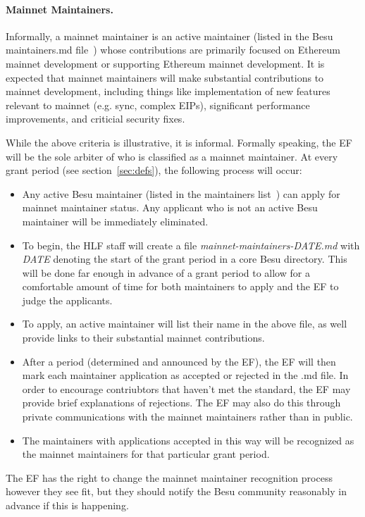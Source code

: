 \paragraph{Mainnet Maintainers.} Informally, a mainnet maintainer is an active maintainer (listed in the Besu maintainers.md file~\cite{BesuM}) whose contributions are primarily focused on Ethereum mainnet development or supporting Ethereum mainnet development.  It is expected that mainnet maintainers will make substantial contributions to mainnet development, including things like implementation of new features relevant to mainnet (e.g. sync, complex EIPs), significant performance improvements, and criticial security fixes.

While the above criteria is illustrative, it is informal.  Formally speaking, the EF will be the sole arbiter of who is classified as a mainnet maintainer.  At every grant period (see section~\ref{sec:defs}), the following process will occur:
\begin{itemize}
\item Any active Besu maintainer (listed in the maintainers list~\cite{BesuM}) can apply for mainnet maintainer status.  Any applicant who is not an active Besu maintainer will be immediately eliminated.
\item To begin, the HLF staff will create a file \emph{mainnet-maintainers-DATE.md} with \emph{DATE} denoting the start of the grant period in a core Besu directory.  This will be done far enough in advance of a grant period to allow for a comfortable amount of time for both maintainers to apply and the EF to judge the applicants.
\item To apply, an active maintainer will list their name in the above file, as well provide links to their substantial mainnet contributions.
\item After a period (determined and announced by the EF), the EF will then mark each maintainer application as accepted or rejected in the .md file.  In order to encourage contriubtors that haven't met the standard, the EF may provide brief explanations of rejections.  The EF may also do this through private communications with the mainnet maintainers rather than in public.
\item The maintainers with applications accepted in this way will be recognized as the mainnet maintainers for that particular grant period.
\end{itemize}

The EF has the right to change the mainnet maintainer recognition process however they see fit, but they should notify the Besu community reasonably in advance if this is happening.

